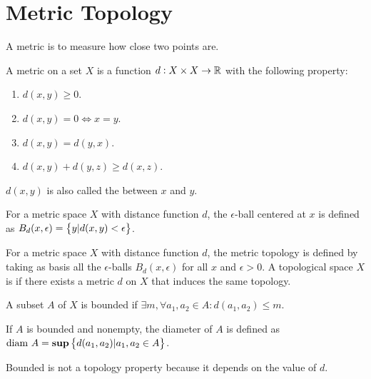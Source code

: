 \section{Metric Topology}

A metric is to measure how close two points are.

\begin{definition}
    A metric on a set $X$ is a function $d: X \times X \rightarrow \mathbb{R}$ with the following property:
    \begin{enumerate}
        \item $d(x,y) \geq 0$.
        \item $d(x,y) = 0 \Leftrightarrow x = y$.
        \item $d(x,y) = d(y,x)$.
        \item $d(x,y) + d(y,z) \geq d(x,z)$.
    \end{enumerate}
    
    $d(x,y)$ is also called the  between $x$ and $y$.
\end{definition}

\begin{definition}
    For a metric space $X$ with distance function $d$, the $\epsilon$-ball centered at $x$ is defined as $B_d(x, \epsilon) = \set{y | d(x,y) < \epsilon}$.
\end{definition}

\begin{definition}
    For a metric space $X$ with distance function $d$, the metric topology is defined by taking as basis all the $\epsilon$-balls $B_d(x,\epsilon)$ for all $x$ and $\epsilon > 0$. A topological space $X$ is  if there exists a metric $d$ on $X$ that induces the same topology.
\end{definition}

\begin{definition}
    A subset $A$ of $X$ is bounded if $\exists m, \forall a_1, a_2 \in A: d(a_1, a_2) \leq m$. 
\end{definition}

\begin{definition}
    If $A$ is bounded and nonempty, the diameter of $A$ is defined as $\text{diam } A = \mathbf{sup} \set{d(a_1, a_2)| a_1, a_2 \in A}$.
    
    Bounded is not a topology property because it depends on the value of $d$.
\end{definition}


